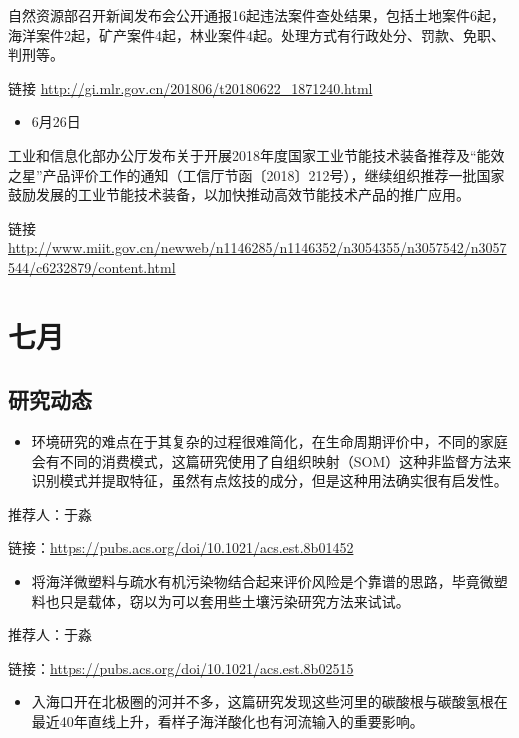 \documentclass[]{book}
\providecommand{\tightlist}{%
  \setlength{\itemsep}{0pt}\setlength{\parskip}{0pt}}
\begin{document}
自然资源部召开新闻发布会公开通报16起违法案件查处结果，包括土地案件6起，海洋案件2起，矿产案件4起，林业案件4起。处理方式有行政处分、罚款、免职、判刑等。

链接 \url{http://gi.mlr.gov.cn/201806/t20180622_1871240.html}

\begin{itemize}
\tightlist
\item
  6月26日
\end{itemize}

工业和信息化部办公厅发布关于开展2018年度国家工业节能技术装备推荐及``能效之星''产品评价工作的通知（工信厅节函〔2018〕212号），继续组织推荐一批国家鼓励发展的工业节能技术装备，以加快推动高效节能技术产品的推广应用。

链接
\url{http://www.miit.gov.cn/newweb/n1146285/n1146352/n3054355/n3057542/n3057544/c6232879/content.html}

\section*{七月}

\subsection*{研究动态}\label{-8}

\begin{itemize}
\tightlist
\item
  环境研究的难点在于其复杂的过程很难简化，在生命周期评价中，不同的家庭会有不同的消费模式，这篇研究使用了自组织映射（SOM）这种非监督方法来识别模式并提取特征，虽然有点炫技的成分，但是这种用法确实很有启发性。
\end{itemize}

推荐人：于淼

链接：\url{https://pubs.acs.org/doi/10.1021/acs.est.8b01452}

\begin{itemize}
\tightlist
\item
  将海洋微塑料与疏水有机污染物结合起来评价风险是个靠谱的思路，毕竟微塑料也只是载体，窃以为可以套用些土壤污染研究方法来试试。
\end{itemize}

推荐人：于淼

链接：\url{https://pubs.acs.org/doi/10.1021/acs.est.8b02515}

\begin{itemize}
\tightlist
\item
  入海口开在北极圈的河并不多，这篇研究发现这些河里的碳酸根与碳酸氢根在最近40年直线上升，看样子海洋酸化也有河流输入的重要影响。
\end{itemize}
\end{document}
